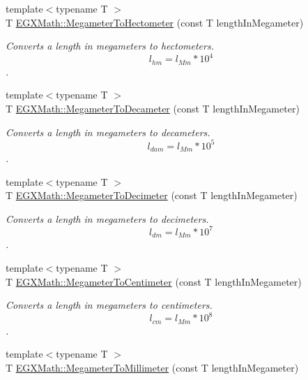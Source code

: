 \begin{DoxyCompactItemize}
{\footnotesize template$<$typename T $>$ }\\T \mbox{\hyperlink{group___e_g_x_math-_conversions-_length_conversions-_s_i-_megameter-_s_i_gad3460fd29fbb8232307cb7cb7265edce}{E\+G\+X\+Math\+::\+Megameter\+To\+Hectometer}} (const T length\+In\+Megameter)
\begin{DoxyCompactList}\small\item\em Converts a length in megameters to hectometers. \[ l_{hm}=l_{Mm} * 10^{4} \]. \end{DoxyCompactList}\item 
{\footnotesize template$<$typename T $>$ }\\T \mbox{\hyperlink{group___e_g_x_math-_conversions-_length_conversions-_s_i-_megameter-_s_i_ga7e758185a466f8ac5f956650312b9019}{E\+G\+X\+Math\+::\+Megameter\+To\+Decameter}} (const T length\+In\+Megameter)
\begin{DoxyCompactList}\small\item\em Converts a length in megameters to decameters. \[ l_{dam}=l_{Mm} * 10^{5} \]. \end{DoxyCompactList}\item 
{\footnotesize template$<$typename T $>$ }\\T \mbox{\hyperlink{group___e_g_x_math-_conversions-_length_conversions-_s_i-_megameter-_s_i_gaf63f319e0852676dab85aaebc462e8a3}{E\+G\+X\+Math\+::\+Megameter\+To\+Decimeter}} (const T length\+In\+Megameter)
\begin{DoxyCompactList}\small\item\em Converts a length in megameters to decimeters. \[ l_{dm}=l_{Mm} * 10^{7} \]. \end{DoxyCompactList}\item 
{\footnotesize template$<$typename T $>$ }\\T \mbox{\hyperlink{group___e_g_x_math-_conversions-_length_conversions-_s_i-_megameter-_s_i_gacbe2b41169d39f02fb70baedf0f8a9c4}{E\+G\+X\+Math\+::\+Megameter\+To\+Centimeter}} (const T length\+In\+Megameter)
\begin{DoxyCompactList}\small\item\em Converts a length in megameters to centimeters. \[ l_{cm}=l_{Mm} * 10^{8} \]. \end{DoxyCompactList}\item 
{\footnotesize template$<$typename T $>$ }\\T \mbox{\hyperlink{group___e_g_x_math-_conversions-_length_conversions-_s_i-_megameter-_s_i_ga8fd5a24935e05ff3f6e0f7e35379357f}{E\+G\+X\+Math\+::\+Megameter\+To\+Millimeter}} (const T length\+In\+Megameter)

\end{DoxyCompactItemize}
